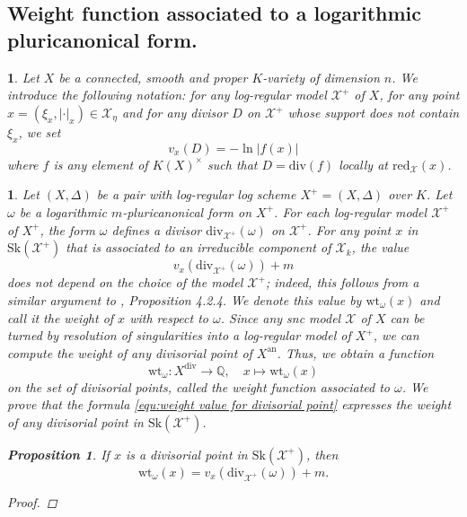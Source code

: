 \documentclass{amsart}%
\numberwithin{equation}{subsection}
\theoremstyle{plain2}
\newtheorem{prop}[equation]{Proposition}
\theoremstyle{definition2}
\theoremstyle{stepstyle}
\theoremstyle{point}
\theoremstyle{subpoint}
\newtheorem{subpoint}[equation]{}%
\newcommand{\spa}[1]{\begin{subpoint}#1\end{subpoint}}           %
\newcommand{\Q}{\ensuremath{\mathbb{Q}}}
\newcommand{\cX}{\ensuremath{\mathscr{X}}}
\newcommand{\redu}{\mathrm{red}}
\newcommand{\an}{\mathrm{an}}
\newcommand{\divisor}{\mathrm{div}}
\newcommand{\weight}{\mathrm{wt}}
\newcommand{\Sk}{\mathrm{Sk}}
\begin{document}
\subsection{Weight function associated to a logarithmic pluricanonical form.}
\spa{Let $X$ be a connected, smooth and proper $K$-variety of dimension $n$. We introduce the following notation: for any log-regular model $\cX^+$ of $X$, for any point $x = (\xi_x,|\cdot|_x) \in \widehat{\cX_{\eta}}$ and for any divisor $D$ on $\cX^+$ whose support does not contain $\xi_x$, we set $$v_x(D) = - \ln |f(x)|$$ where $f$ is any element of $K(X)^\times$ such that $D= \divisor(f)$ locally at $\redu_{\cX}(x)$.}

\spa{Let $(X,\Delta)$ be a pair with log-regular log scheme $X^+=(X,\Delta)$ over $K$. Let $\omega$ be a logarithmic $m$-pluricanonical form on $X^+$. For each log-regular model $\cX^+$ of $X^+$, the form $\omega$ defines a divisor $\divisor_{\cX^+}(\omega)$ on $\cX^+$. For any point $x$ in $\Sk(\cX^+)$ that is associated to an irreducible component of $\cX_k$, the value \begin{equation} \label{equ:weight value for divisorial point}
v_x(\divisor_{\cX^+}(\omega)) +m
\end{equation} does not depend on the choice of the model $\cX^+$; indeed, this follows from a similar argument to \cite{MustataNicaise}, Proposition 4.2.4. We denote this value by $\weight_{\omega}(x)$ and call it the weight of $x$ with respect to $\omega$. Since any snc model $\cX$ of $X$ can be turned by resolution of singularities into a log-regular model of $X^+$, we can compute the weight of any divisorial point of $X^\an$. Thus, we obtain a function $$\weight_{\omega}: X^{\divisor} \rightarrow \Q, \quad x \mapsto \weight_{\omega}(x)$$ on the set of divisorial points, called the weight function associated to $\omega$. We prove that the formula \ref{equ:weight value for divisorial point} expresses the weight of any divisorial point in $\Sk(\cX^+)$.

\begin{prop} \label{prop weight function on log regular model}
If $x$ is a divisorial point in $\Sk(\cX^+)$, then $$\weight_{\omega}(x)=v_x(\divisor_{\cX^+}(\omega)) +m.$$
\end{prop}
\begin{proof}

\end{proof}
}
\end{document}
